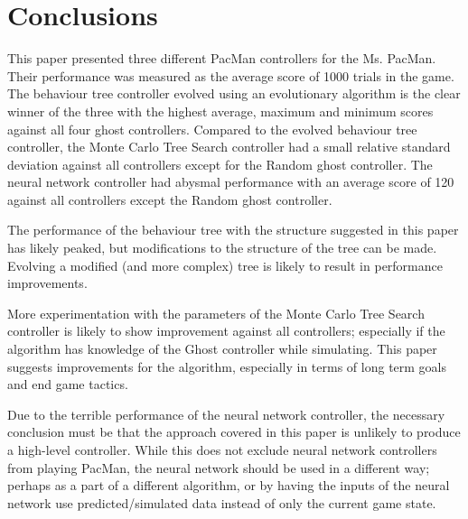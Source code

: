 \section{Conclusions}
This paper presented three different PacMan controllers for the Ms. PacMan. Their performance was measured as the average score of 1000 trials in the game. The behaviour tree controller evolved using an evolutionary algorithm is the clear winner of the three with the highest average, maximum and minimum scores against all four ghost controllers. Compared to the evolved behaviour tree controller, the Monte Carlo Tree Search controller had a small relative standard deviation against all controllers except for the Random ghost controller. The neural network controller had abysmal performance with an average score of 120 against all controllers except the Random ghost controller.

The performance of the behaviour tree with the structure suggested in this paper has likely peaked, but modifications to the structure of the tree can be made. Evolving a modified (and more complex) tree is likely to result in performance improvements.

More experimentation with the parameters of the Monte Carlo Tree Search controller is likely to show improvement against all controllers; especially if the algorithm has knowledge of the Ghost controller while simulating. This paper suggests improvements for the algorithm, especially in terms of long term goals and end game tactics.

Due to the terrible performance of the neural network controller, the necessary conclusion must be that the approach covered in this paper is unlikely to produce a high-level controller. While this does not exclude neural network controllers from playing PacMan, the neural network should be used in a different way; perhaps as a part of a different algorithm, or by having the inputs of the neural network use predicted/simulated data instead of only the current game state.